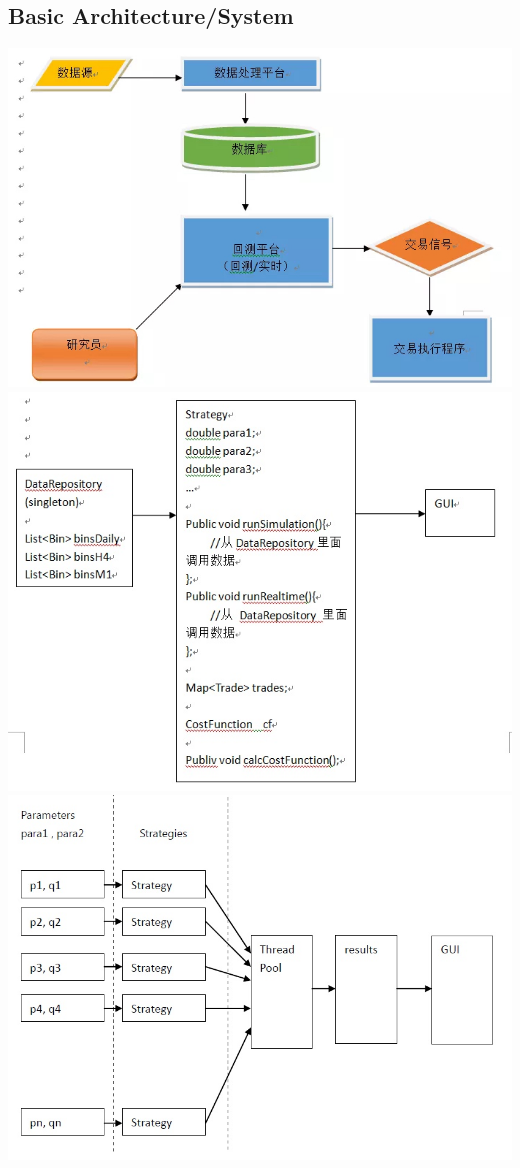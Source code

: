 \documentclass[11pt, openany]{book}              %
\begin{document}
\subsection{Basic Architecture/System}
\includegraphics[scale=0.5]{1.JPG}
\includegraphics[scale=0.5]{2.JPG}
\includegraphics[scale=0.5]{3.JPG}
\end{document}
